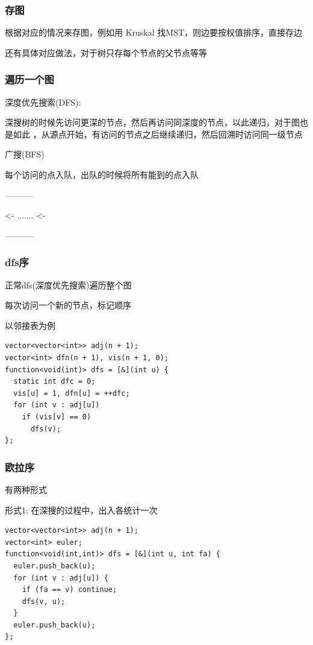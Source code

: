 \documentclass{beamer}
\begin{document}
  \begin{frame}
    \frametitle{存图}

    根据对应的情况来存图，例如用 Kruskal 找MST，则边要按权值排序，直接存边

    \vspace*{1\baselineskip}

    还有具体对应做法，对于树只存每个节点的父节点等等


  \end{frame}

  \begin{frame}
    \frametitle{遍历一个图}
    深度优先搜索(DFS):

    深搜树的时候先访问更深的节点，然后再访问同深度的节点，以此递归，对于图也是如此
    ，从源点开始，有访问的节点之后继续递归，然后回溯时访问同一级节点

    \vspace*{1\baselineskip}

    广搜(BFS)

    每个访问的点入队，出队的时候将所有能到的点入队

    -----------

    <- ....... <-

    -----------
    
  \end{frame}


  \begin{frame}[fragile]
    \frametitle{dfs序}
    正常dfs(深度优先搜索)遍历整个图

    每次访问一个新的节点，标记顺序

    以邻接表为例

    \begin{lstlisting}
vector<vector<int>> adj(n + 1);
vector<int> dfn(n + 1), vis(n + 1, 0);
function<void(int)> dfs = [&](int u) {
  static int dfc = 0;
  vis[u] = 1, dfn[u] = ++dfc;
  for (int v : adj[u])
    if (vis[v] == 0)
      dfs(v);
};
    \end{lstlisting}
  \end{frame}

  \begin{frame}[fragile]
    \frametitle{欧拉序}

    有两种形式

    形式1: 在深搜的过程中，出入各统计一次

      \begin{lstlisting}
vector<vector<int>> adj(n + 1);
vector<int> euler;
function<void(int,int)> dfs = [&](int u, int fa) {
  euler.push_back(u);
  for (int v : adj[u]) {
    if (fa == v) continue;
    dfs(v, u);
  }
  euler.push_back(u);
};
      \end{lstlisting}
  \end{frame}
\end{document}
